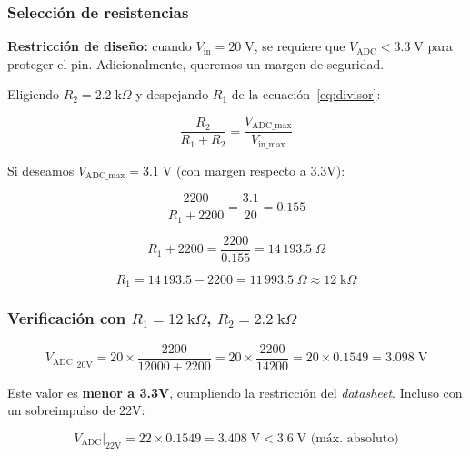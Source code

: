 \documentclass[letterpaper,12pt]{article}
\begin{document}
    \subsubsection{Selección de resistencias}

    \textbf{Restricción de diseño:} cuando $V_{\text{in}} = 20\;\text{V}$, se requiere que $V_{\text{ADC}} < 3.3\;\text{V}$ para proteger el pin. Adicionalmente, queremos un margen de seguridad.

    Eligiendo $R_2 = 2.2\;\text{k}\Omega$ y despejando $R_1$ de la ecuación~\eqref{eq:divisor}:

    \begin{equation}
        \frac{R_2}{R_1 + R_2} = \frac{V_{\text{ADC\_max}}}{V_{\text{in\_max}}}
    \end{equation}

    Si deseamos $V_{\text{ADC\_max}} = 3.1\;\text{V}$ (con margen respecto a 3.3V):

    \begin{equation}
        \frac{2200}{R_1 + 2200} = \frac{3.1}{20} = 0.155
    \end{equation}

    \begin{equation}
        R_1 + 2200 = \frac{2200}{0.155} = 14\,193.5\;\Omega
    \end{equation}

    \begin{equation}
        R_1 = 14\,193.5 - 2200 = 11\,993.5\;\Omega \approx 12\;\text{k}\Omega
    \end{equation}

    \subsubsection{Verificación con $R_1 = 12\;\text{k}\Omega$, $R_2 = 2.2\;\text{k}\Omega$}

    \begin{equation}
        V_{\text{ADC}}\big|_{20\text{V}} = 20 \times \frac{2200}{12000 + 2200} = 20 \times \frac{2200}{14200} = 20 \times 0.1549 = \boxed{3.098\;\text{V}}
    \end{equation}

    Este valor es \textbf{menor a 3.3V}, cumpliendo la restricción del \textit{datasheet}. Incluso con un sobreimpulso de 22V:

    \begin{equation}
        V_{\text{ADC}}\big|_{22\text{V}} = 22 \times 0.1549 = 3.408\;\text{V} < 3.6\;\text{V (máx.\ absoluto)}
    \end{equation}
\end{document}
